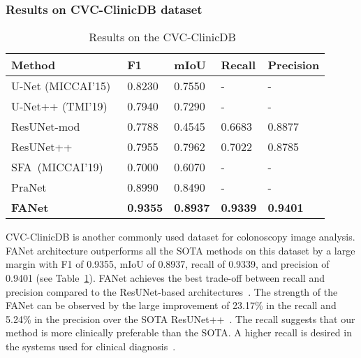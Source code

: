 \documentclass[journal]{IEEEtran}
\begin{document}
\subsubsection{Results on CVC-ClinicDB dataset}
\begin{table}[!t]
\footnotesize
\centering
\caption{Results on the CVC-ClinicDB~\cite{bernal2015wm}}
\vspace{0.1cm}
\begin{tabular}{@{}l|l|l|l|l@{}}
\toprule
\textbf{Method} & \textbf{F1} & \textbf{mIoU }& \textbf{Recall} & \textbf{Precision} \\ 
\hline
\hline
U-Net (MICCAI’15)~\cite{ronneberger2015u} & 0.8230 & 0.7550 & -  & - \\ U-Net++ (TMI’19)~\cite{zhou2018unet} & 0.7940 & 0.7290 & - & -  \\ ResUNet-mod~\cite{zhang2018road} & 0.7788 & 0.4545 & 0.6683 & 0.8877 \\ ResUNet++~\cite{jha2019resunet++}  & 0.7955 & 0.7962 & 0.7022 & 0.8785 \\ SFA~(MICCAI’19)~\cite{fang2019selective} & 0.7000 & 0.6070 & - & - \\ PraNet~\cite{fan2020pranet} & 0.8990 & 0.8490 & - & - \\ \textbf{FANet} &\textbf{0.9355} & \textbf{0.8937} & \textbf{0.9339} & \textbf{0.9401} \\ \bottomrule
\end{tabular}
\label{tab:cvclinicDB}

\end{table}
CVC-ClinicDB is another commonly used dataset for colonoscopy image analysis. FANet architecture outperforms all the \ac{SOTA} methods on this dataset by a large margin with F1 of 0.9355, \ac{mIoU} of 0.8937, recall of 0.9339, and precision of 0.9401 (see Table~\ref{tab:cvclinicDB}). FANet achieves the best trade-off between recall and precision compared to the ResUNet-based architectures~\cite{zhang2018road,jha2019resunet++}. The strength of the FANet can be observed by the large improvement of 23.17\% in the recall and 5.24\% in the precision over the \ac{SOTA} ResUNet++~\cite{jha2019resunet++}. The recall suggests that our method is more clinically preferable than the \ac{SOTA}. A higher recall is desired in the systems used for clinical diagnosis~\cite{gilvary2019missing}.
\end{document}
